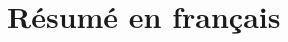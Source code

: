 
\chapter*{Résumé en français}
\frenchspacing
\renewcommand\thefigure{\Roman{figure}} 
\renewcommand\thetable{\Roman{table}}  






%

\renewcommand\thefigure{\thechapter.\arabic{figure}}
\renewcommand\thetable{\thechapter.\arabic{table}}

\nonfrenchspacing
{}
